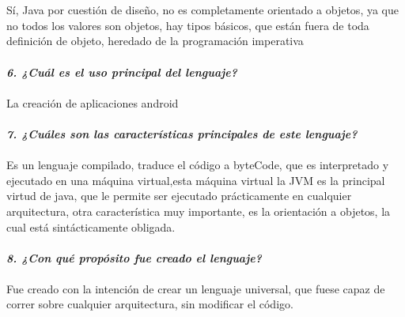 \documentclass{article}
\begin{document}
\\\\Sí, Java por cuestión de diseño, no es completamente orientado a objetos, ya que no todos los valores son objetos, hay tipos básicos, que están fuera de toda definición de objeto, heredado de la programación imperativa\\\\
\textbf{\textit{6. ¿Cuál es el uso principal del lenguaje?}}
\\\\
La creación de aplicaciones android\\\\
\textbf{\textit{7. ¿Cuáles son las características principales de este lenguaje?}}\\
\\Es un lenguaje compilado, traduce el código a byteCode, que es interpretado y ejecutado en una máquina virtual,esta máquina virtual la JVM es la principal virtud de java, que le permite ser ejecutado prácticamente en cualquier arquitectura, otra característica muy importante, es la orientación a objetos, la cual está sintácticamente obligada.\\\\
\textbf{\textit{8. ¿Con qué propósito fue creado el lenguaje?}}
\\\\
Fue creado con la intención de crear un lenguaje universal, que fuese capaz de correr sobre cualquier arquitectura, sin modificar el código.
\\\\
\end{document}
